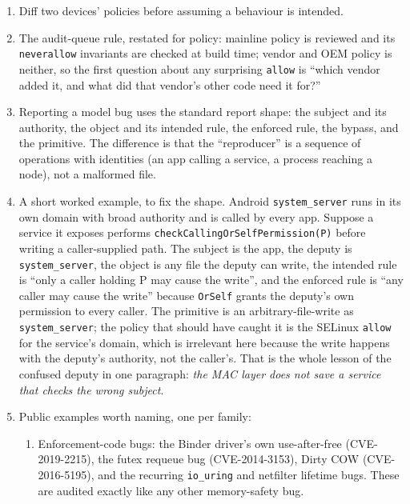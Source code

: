 \documentclass[12pt]{Training}
\begin{document}
\begin{enumerate}
\begin{sectionbox}
\begin{lstlisting}[language=bash, caption={Model enumeration recipes (Linux host / Android device / the policy files).}]
# the policy files
#   system/sepolicy in AOSP, sepolicy/ in a vendor image,
#   and the compiled policy.<ver> on the device
    \end{lstlisting}
    \end{sectionbox}
    \item Diff two devices' policies before assuming a behaviour is intended.
    \item The audit-queue rule, restated for policy: mainline policy is reviewed and its \lstinline{neverallow} invariants are checked at build time; vendor and OEM policy is neither, so the first question about any surprising \lstinline{allow} is ``which vendor added it, and what did that vendor's other code need it for?''
    \item Reporting a model bug uses the standard report shape: the subject and its authority, the object and its intended rule, the enforced rule, the bypass, and the primitive. The difference is that the ``reproducer'' is a sequence of operations with identities (an app calling a service, a process reaching a node), not a malformed file.
    \item A short worked example, to fix the shape. Android \lstinline{system_server} runs in its own domain with broad authority and is called by every app. Suppose a service it exposes performs \lstinline{checkCallingOrSelfPermission(P)} before writing a caller-supplied path. The subject is the app, the deputy is \lstinline{system_server}, the object is any file the deputy can write, the intended rule is ``only a caller holding P may cause the write'', and the enforced rule is ``any caller may cause the write'' because \lstinline{OrSelf} grants the deputy's own permission to every caller. The primitive is an arbitrary-file-write as \lstinline{system_server}; the policy that should have caught it is the SELinux \lstinline{allow} for the service's domain, which is irrelevant here because the write happens with the deputy's authority, not the caller's. That is the whole lesson of the confused deputy in one paragraph: \emph{the MAC layer does not save a service that checks the wrong subject}.
    \item Public examples worth naming, one per family:
    \begin{enumerate}
        \item Enforcement-code bugs: the Binder driver's own use-after-free (CVE-2019-2215), the futex requeue bug (CVE-2014-3153), Dirty COW (CVE-2016-5195), and the recurring \lstinline{io_uring} and netfilter lifetime bugs. These are audited exactly like any other memory-safety bug.

\end{enumerate}
\end{enumerate}
\end{document}
